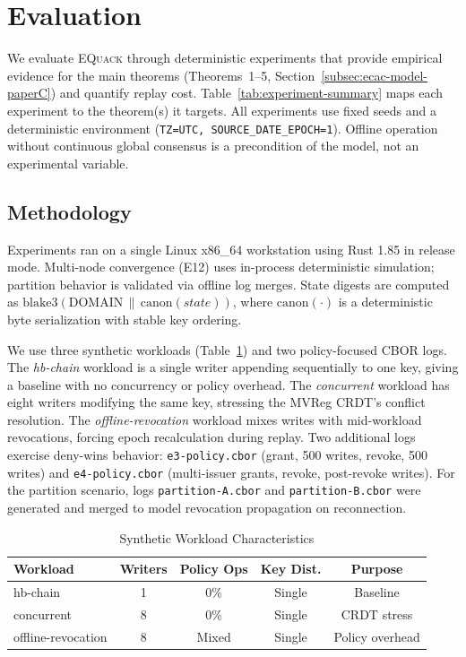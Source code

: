 \documentclass[10pt,journal,compsoc]{IEEEtran}
\newcommand{\equack}{\textsc{EQuack}}
\begin{document}
\section{Evaluation}
\label{sec:eval-paperC}

We evaluate \equack{} through deterministic experiments that provide
empirical evidence for the main theorems (Theorems~1--5,
Section~\ref{subsec:ecac-model-paperC}) and quantify replay cost.
Table~\ref{tab:experiment-summary} maps each experiment to the
theorem(s) it targets. All experiments use fixed seeds and a
deterministic environment (\texttt{TZ=UTC, SOURCE\_DATE\_EPOCH=1}).
Offline operation without continuous global consensus is a
precondition of the model, not an experimental variable.

\subsection{Methodology}\label{subsec:methodology-paperC}

Experiments ran on a single Linux x86\_64 workstation using Rust 1.85 in release mode. Multi-node convergence (E12) uses in-process deterministic simulation; partition behavior is validated via offline log merges. State digests are computed as $\mathrm{blake3}(\mathrm{DOMAIN}\,\|\,\mathrm{canon}(\textit{state}))$, where $\mathrm{canon}(\cdot)$ is a deterministic byte serialization with stable key ordering.

We use three synthetic workloads (Table~\ref{tab:workloads-paperC}) and two policy-focused CBOR logs. The \emph{hb-chain} workload is a single writer appending sequentially to one key, giving a baseline with no concurrency or policy overhead. The \emph{concurrent} workload has eight writers modifying the same key, stressing the MVReg CRDT's conflict resolution. The \emph{offline-revocation} workload mixes writes with mid-workload revocations, forcing epoch recalculation during replay. Two additional logs exercise deny-wins behavior: \texttt{e3-policy.cbor} (grant, 500 writes, revoke, 500 writes) and \texttt{e4-policy.cbor} (multi-issuer grants, revoke, post-revoke writes). For the partition scenario, logs \texttt{partition-A.cbor} and \texttt{partition-B.cbor} were generated and merged to model revocation propagation on reconnection.

\begin{table}[htbp]
\centering
\caption{Synthetic Workload Characteristics}
\label{tab:workloads-paperC}

\footnotesize
\setlength{\tabcolsep}{4pt}
\renewcommand{\arraystretch}{1.1}

\begin{tabular}{@{}lcccc@{}}
\toprule
\textbf{Workload} & \textbf{Writers} & \textbf{Policy Ops} & \textbf{Key Dist.} & \textbf{Purpose} \\
\midrule
hb-chain                    & 1 & 0\%   & Single & Baseline \\
concurrent                  & 8 & 0\%   & Single & CRDT stress \\
offline-\allowbreak revocation & 8 & Mixed & Single & Policy overhead \\
\bottomrule
\end{tabular}
\end{table}
\end{document}
